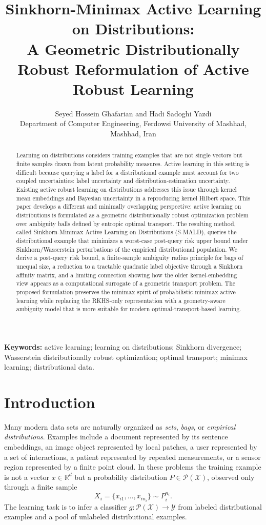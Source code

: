\documentclass[11pt,a4paper]{article}
\title{Sinkhorn-Minimax Active Learning on Distributions: \\
A Geometric Distributionally Robust Reformulation of Active Robust Learning}
\author{Seyed Hossein Ghafarian and Hadi Sadoghi Yazdi\\
\small Department of Computer Engineering, Ferdowsi University of Mashhad, Mashhad, Iran}
\date{}
\newcommand{\R}{\mathbb{R}}
\newcommand{\cY}{\mathcal{Y}}
\newcommand{\cX}{\mathcal{X}}
\newcommand{\cP}{\mathcal{P}}
\begin{document}
\maketitle

\begin{abstract}
Learning on distributions considers training examples that are not single vectors but finite samples drawn from latent probability measures. Active learning in this setting is difficult because querying a label for a distributional example must account for two coupled uncertainties: label uncertainty and distribution-estimation uncertainty. Existing active robust learning on distributions addresses this issue through kernel mean embeddings and Bayesian uncertainty in a reproducing kernel Hilbert space. This paper develops a different and minimally overlapping perspective: active learning on distributions is formulated as a geometric distributionally robust optimization problem over ambiguity balls defined by entropic optimal transport. The resulting method, called Sinkhorn-Minimax Active Learning on Distributions (S-MALD), queries the distributional example that minimizes a worst-case post-query risk upper bound under Sinkhorn/Wasserstein perturbations of the empirical distributional population. We derive a post-query risk bound, a finite-sample ambiguity radius principle for bags of unequal size, a reduction to a tractable quadratic label objective through a Sinkhorn affinity matrix, and a limiting connection showing how the older kernel-embedding view appears as a computational surrogate of a geometric transport problem. The proposed formulation preserves the minimax spirit of probabilistic minimax active learning while replacing the RKHS-only representation with a geometry-aware ambiguity model that is more suitable for modern optimal-transport-based learning.
\end{abstract}

\noindent\textbf{Keywords:} active learning; learning on distributions; Sinkhorn divergence; Wasserstein distributionally robust optimization; optimal transport; minimax learning; distributional data.

\section{Introduction}

Many modern data sets are naturally organized as \emph{sets}, \emph{bags}, or \emph{empirical distributions}. Examples include a document represented by its sentence embeddings, an image object represented by local patches, a user represented by a set of interactions, a patient represented by repeated measurements, or a sensor region represented by a finite point cloud. In these problems the training example is not a vector $x\in\R^d$ but a probability distribution $P\in\cP(\cX)$, observed only through a finite sample
\[
X_i=\{x_{i1},\ldots,x_{in_i}\}\sim P_i^{n_i}.
\]
The learning task is to infer a classifier $g:\cP(\cX)\to\cY$ from labeled distributional examples and a pool of unlabeled distributional examples.
\end{document}
